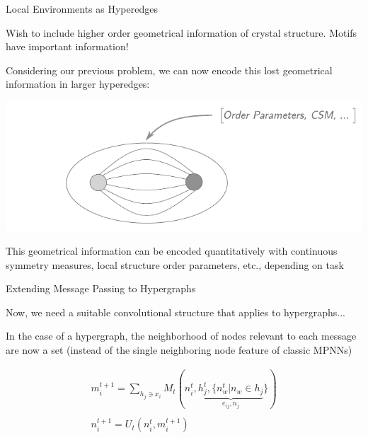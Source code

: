 \documentclass[11pt]{beamer}
\begin{document}
\begin{frame}{Local Environments as Hyperedges}


Wish to include higher order geometrical information of crystal structure. Motifs have important information!

\medskip

Considering our previous problem, we can now encode this lost geometrical information in larger hyperedges:

\medskip

\hspace{1cm}\includegraphics[scale=0.7]{motiflevel_ex.pdf}

\medskip

This geometrical information can be encoded quantitatively with continuous symmetry measures, local structure order parameters, etc., depending on task


\end{frame}


\begin{frame}{Extending Message Passing to Hypergraphs}

Now, we need a suitable convolutional structure that applies to hypergraphs...

\medskip

In the case of a hypergraph, the neighborhood of nodes relevant to each message are now a set (instead of the single neighboring node feature of classic MPNNs)

\begin{gather*}
m_i^{t+1}=\sum_{h_j\ni x_i} M_t(n_i^{t},\underbrace{h_j^{t},\lbrace  n_w^t \vert n_w \in h_j }_{e_{ij},n_j}\rbrace)\\
\\
n_i^{t+1}=U_t(n_i^t,m_i^{t+1})\\
\end{gather*}
\end{frame}
\end{document}
